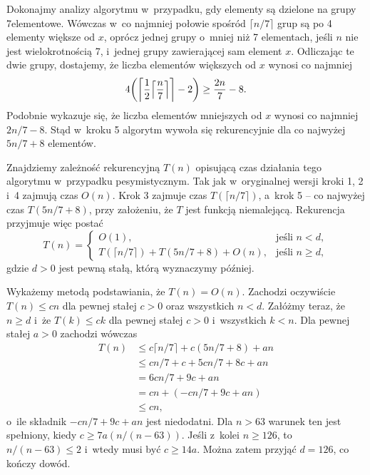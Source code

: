 
\exercise %
Dokonajmy analizy algorytmu  w~przypadku, gdy elementy są dzielone na grupy 7\nbhyphen elementowe.
Wówczas w~co najmniej połowie spośród $\lceil n/7\rceil$ grup są po 4 elementy większe od $x$, oprócz jednej grupy o~mniej niż 7 elementach, jeśli $n$ nie jest wielokrotnością 7, i~jednej grupy zawierającej sam element $x$.
Odliczając te dwie grupy, dostajemy, że liczba elementów większych od $x$ wynosi co najmniej
\[
	4\biggl(\biggl\lceil\frac{1}{2}\Bigl\lceil\frac{n}{7}\Bigr\rceil\biggr\rceil-2\biggr) \ge \frac{2n}{7}-8.
\]
Podobnie wykazuje się, że liczba elementów mniejszych od $x$ wynosi co najmniej $2n/7-8$.
Stąd w~kroku 5 algorytm wywoła się rekurencyjnie dla co najwyżej $5n/7+8$ elementów.

Znajdziemy zależność rekurencyjną $T(n)$ opisującą czas działania tego algorytmu w~przypadku pesymistycznym.
Tak jak w~oryginalnej wersji kroki 1, 2 i~4 zajmują czas $O(n)$.
Krok 3 zajmuje czas $T(\lceil n/7\rceil)$, a~krok 5 -- co najwyżej czas $T(5n/7+8)$, przy założeniu, że $T$ jest funkcją niemalejącą.
Rekurencja przyjmuje więc postać
\[
	T(n) = \begin{cases}
		O(1), & \text{jeśli $n<d$}, \\
		T(\lceil n/7\rceil)+T(5n/7+8)+O(n), & \text{jeśli $n\ge d$},
	\end{cases}
\]
gdzie $d>0$ jest pewną stałą, którą wyznaczymy później.

Wykażemy metodą podstawiania, że $T(n)=O(n)$.
Zachodzi oczywiście $T(n)\le cn$ dla pewnej stałej $c>0$ oraz wszystkich $n<d$.
Załóżmy teraz, że $n\ge d$ i~że $T(k)\le ck$ dla pewnej stałej $c>0$ i~wszystkich $k<n$.
Dla pewnej stałej $a>0$ zachodzi wówczas
\begin{align*}
	T(n) &\le c\lceil n/7\rceil+c(5n/7+8)+an \\
	&\le cn/7+c+5cn/7+8c+an \\
	&= 6cn/7+9c+an \\
	&= cn+(-cn/7+9c+an) \\
	&\le cn,
\end{align*}
o~ile składnik $-cn/7+9c+an$ jest niedodatni.
Dla $n>63$ warunek ten jest spełniony, kiedy $c\ge7a(n/(n-63))$.
Jeśli z~kolei $n\ge126$, to $n/(n-63)\le2$ i~wtedy musi być $c\ge14a$.
Można zatem przyjąć $d=126$, co kończy dowód.

